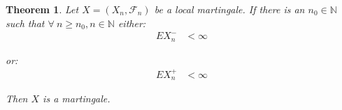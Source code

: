 \documentclass[12pt]{article}
\theoremstyle{definition}
\theoremstyle{plain}
\newtheorem*{Lem}{Theorem}
\begin{document}
\begin{Lem}
Let $X = (X_n, \mathcal{F}_n)$ be a local martingale. If there is an $n_0 \in \mathbb{N}$ such that $\forall \ n \geq n_0, n \in \mathbb{N}$ either:
\begin{align*}
E X_n^{-} &< \infty
\end{align*}

or:
\begin{align*}
E X_n^{+} &< \infty
\end{align*}

Then $X$ is a martingale.
\end{Lem}
\end{document}
